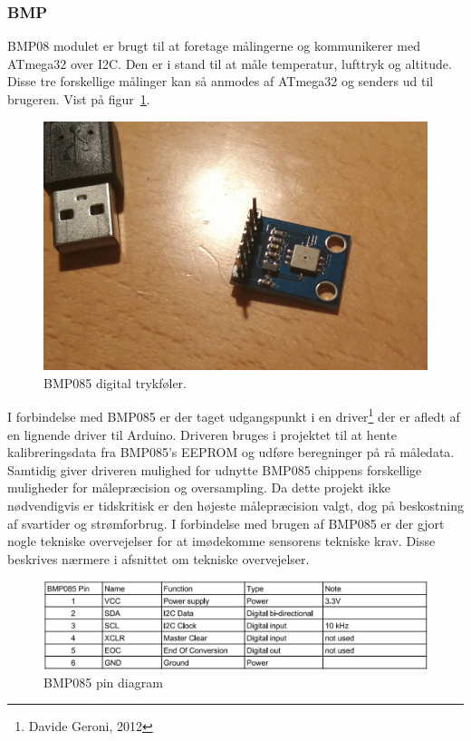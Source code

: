 \subsubsection{BMP}
BMP08 modulet er brugt til at foretage målingerne og kommunikerer med ATmega32 over I2C. Den er i stand til at måle temperatur, lufttryk og altitude. 
Disse tre forskellige målinger kan så anmodes af ATmega32 og senders ud til brugeren. Vist på figur~\ref{fig:devicebmp}.

\begin{figure}[h]
	\centering
	\includegraphics[width=0.7\linewidth]{figs/device_bmp.jpg}
	\caption{BMP085 digital trykføler.}
	\label{fig:devicebmp}
\end{figure}

I forbindelse med BMP085 er der taget udgangspunkt i en driver\footnote{Davide Geroni, 2012} der er afledt af en lignende driver til Arduino.
Driveren bruges i projektet til at hente kalibreringsdata fra BMP085's EEPROM og udføre beregninger på rå måledata. Samtidig giver driveren 
mulighed for udnytte BMP085 chippens forskellige muligheder for målepræcision og oversampling. Da dette projekt ikke nødvendigvis er tidskritisk er 
den højeste målepræcision valgt, dog på beskostning af svartider og strømforbrug.
I forbindelse med brugen af BMP085 er der gjort nogle tekniske overvejelser for at imødekomme sensorens tekniske krav. Disse beskrives nærmere i afsnittet om tekniske overvejelser.

\begin{figure}[h]
	\centering
	\includegraphics[width=\linewidth]{figs/bmp085_pin_diagram}
	\caption{BMP085 pin diagram}
	\label{fig:gmp085pindiagram}
\end{figure}
